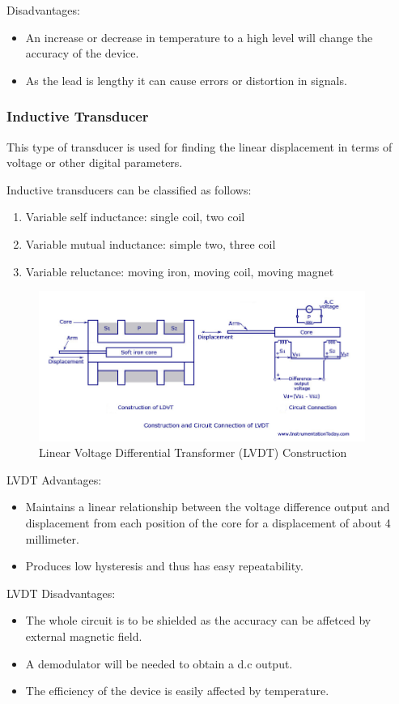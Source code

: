 Disadvantages:
\begin{itemize}
  \item An increase or decrease in temperature to a high level will change the accuracy of the device.
  \item As the lead is lengthy it can cause errors or distortion in signals.
\end{itemize}

\subsubsection{Inductive Transducer}
This type of transducer is used for finding the linear displacement in terms of voltage or other digital parameters.

Inductive transducers can be classified as follows:
\begin{enumerate}
  \item Variable self inductance: single coil, two coil
  \item Variable mutual inductance: simple two, three coil
  \item Variable reluctance: moving iron, moving coil, moving magnet
\end{enumerate}

\begin{figure}
  \centering
  \includegraphics[width=4.2in]{fig/LVDT-Construction.jpg}
  \caption{Linear Voltage Differential Transformer (LVDT) Construction}\label{fig_LVDT}
\end{figure}

LVDT Advantages:
\begin{itemize}
  \item Maintains a linear relationship between the voltage difference output and displacement from each position of the core for a displacement of about 4 millimeter.
  \item Produces low hysteresis and thus has easy repeatability.
\end{itemize}

LVDT Disadvantages:
\begin{itemize}
  \item The whole circuit is to be shielded as the accuracy can be affetced by external magnetic field.
  \item A demodulator will be needed to obtain a d.c output.
  \item The efficiency of the device is easily affected by temperature.
\end{itemize}

